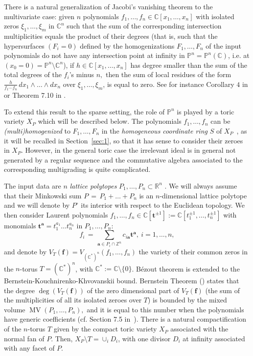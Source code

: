 \documentclass[a4paper,11pt]{amsart}
\newcommand{\MV}{\operatorname{MV}}
\newcommand{\C}{\mathbb{C}}
\renewcommand{\P}{\mathbb{P}}
\newcommand{\R}{\mathbb{R}}
\newcommand{\Z}{\mathbb{Z}}
\newcommand{\bfa}{{\boldsymbol{a}}}
\newcommand{\bff}{{\boldsymbol{f}}}
\newcommand{\bft}{{\boldsymbol{t}}}
\numberwithin{thm}{section}
\numberwithin{equation}{section}
\theoremstyle{definition}
\theoremstyle{plain}
\begin{document}
There is a natural generalization of Jacobi's vanishing theorem to the multivariate case: given 
$n$ polynomials $f_1, \dots, f_n \in \C[x_1, \dots, x_n]$ with isolated zeros $\xi_1, \dots, \xi_m$ in $\C^n$ 
such that the sum of the corresponding intersection multiplicities equals the product of their degrees (that is, such that the hypersurfaces
$(F_i=0)$ defined by the homogenizations $F_1, \dots, F_n$ of the input polynomials do not have any intersection point at infinity in $\P^n= \P^n(\C)$, 
 i.e. at $(x_0=0)=\P^n\setminus\C^n$), if $h\in\C[x_1,\ldots, x_n]$ has degree smaller than the sum of the total degrees of the $f_i$'s  minus $n,$ then the sum of local residues of the form $\frac h {f_1 \cdots f_n} \, dx_1 \wedge \dots \wedge dx_n$  over
$\xi_1, \dots, \xi_m$, is equal to zero. See for instance Corollary $4$ in \cite[Chapter 5]{AGV85} or Theorem 7.10 in \cite{kun08}.


To extend this result to the sparse setting, the role of $\P^n$ is played by a toric variety $X_P$ which will be described below. The polynomials 
$f_1,\ldots, f_n$ can be {\em (multi)homogenized}  to $F_1,\ldots, F_n$ in  the \textit{homogeneous coordinate ring} $S$ of $X_P$~\cite{cox95},  
as it will be recalled in Section~\ref{sec:1}, so that it has sense to consider their zeroes in $X_P$. However, in the general toric case the irrelevant ideal is in general  
not generated by a regular sequence and the commutative algebra 
associated to the corresponding multigrading is quite complicated.

The input data are $n$ {\em lattice polytopes} $P_1, \dots, P_n \subset \R^n$ . We will always assume that their Minkowski sum
 $ P \, = \, P_1 + \dots + P_n$ is an $n$-dimensional lattice polytope and we will denote by $P^\circ$ its interior with respect to the Euclidean topology. We then consider Laurent polynomials 
 $f_1, \dots, f_n \in \C[\bft^{\pm1}]:=\C[t_1^{\pm1},\ldots, t_n^{\pm1}]$ with monomials $\bft^{\bfa} = t_1^{a_1}\dots t_n^{a_n}$ in $P_1, \dots, P_n$:
\begin{equation}\label{eq:efes}
f_i \, = \, \sum_{\bfa\in P_i \cap \Z^n} c_{i{\bfa}}\bft^{\bfa}, \ i=1,\ldots, n,
\end{equation}
and denote by $V_T(\bff) =V_{(\C^*)^n}(f_1,\ldots, f_n)$ the variety of their common zeros in the $n$-torus $T = (\C^*)^n$, with  $\C^*:=\C\setminus\{0\}$.
 B\'ezout theorem is extended to the Bernstein-Kouchnirenko-Khvovanskii bound. 
Bernstein Theorem (\cite{ber75}) states that the degree $\deg(V_T(\bff))$  of the zero dimensional part of $V_T(\bff)$ (the sum of the multiplicities of all its isolated zeroes over $T$) is bounded by 
the mixed volume $\MV(P_1,\ldots, P_n),$ and it is equal to this number when the polynomials have generic coefficients (cf. Section 7.5 in~\cite{CLO05}).
 There is a natural compactification 
of the $n$-torus $T$ given by the compact toric variety $X_P$ associated with the normal fan of $P$.
Then,  $X_P \setminus T = \cup_i D_i$, with one divisor $ D_i$ at infinity associated  with any facet of $P$.
\end{document}
